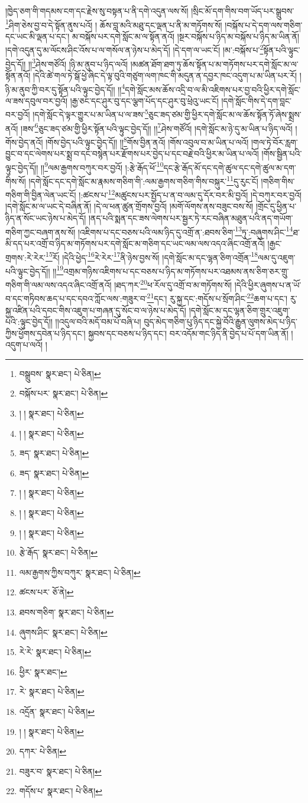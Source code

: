 །ཁྱེད་ཅག་གི་གདམས་ངག་དང་རྗེས་སུ་བསྟན་པ་ནི་དགེ་འདུན་ལས་སོ། །སྲིང་མོ་དག་གིས་བག་ཡོད་པར་སྒྲུབས་\footnote{བསྒྲུབས་  སྣར་ཐང་།  པེ་ཅིན། }ཤིག་ཅེས་བྱ་བ་དེ་སྟོན་ནུས་པའོ། །
ཆོས་བླ་མའི་མཐུ་དང་ལྡན་པ་ནི་མ་གཏོགས་སོ། །བསྐོས་པ་དེ་དག་ལས་གཅིག་དང་ཡང་མི་ལྡན་པ་དང་། མ་བསྐོས་པར་དགེ་སློང་མ་ལ་སྟོན་ནའོ། །སྔར་བསྐོས་པ་ཉིད་མ་བསྐོས་པ་ཉིད་མ་ཡིན་ནོ། །དགེ་འདུན་དུ་མ་ལོངས་ཤིང་འོས་པ་ལ་གསོལ་ན་ཉེས་པ་མེད་དོ། །དེ་དག་ལ་ཡང་ངོ། །མ་:བསྐོས་པ་\footnote{བསྐོས་པར་  སྣར་ཐང་།  པེ་ཅིན། }སྟོན་པའི་ལྟུང་བྱེད་དོ།། །།\footnote{། །  སྣར་ཐང་།  པེ་ཅིན། }ཤེས་གཙོའོ། །ཉི་མ་ནུབ་པ་ཉིད་ལའོ། །མཚན་ཐོག་ཐག་ཏུ་ཆོས་སྟོན་པ་མ་གཏོགས་པར་དགེ་སློང་མ་ལ་སྟོན་ནའོ། །དེའི་ཚེ་གལ་ཏེ་སྒོ་ཕྱེ་ཞིང་དེ་ལྟ་བུའི་གཙུག་ལག་ཁང་གི་མདུན་ན་དབྱར་ཁང་འདུག་པ་མ་ཡིན་པར་རོ། །ཉི་མ་ནུབ་ཀྱི་བར་དུ་སྟོན་པའི་ལྟུང་བྱེད་དོ།། །།\footnote{། །  སྣར་ཐང་།  པེ་ཅིན། }དགེ་སློང་མས་ཆོས་འདྲི་བ་ལ་མི་འཇིགས་པར་བྱ་བའི་ཕྱིར་དགེ་སློང་ལ་ཟས་དབུལ་བར་བྱའོ། །རྒྱ་ཅང་དང་ཤུར་བུ་དང་ལྕག་པོད་དང་ཤུར་བུ་ཕྲེའུ་ཡང་ངོ། །དགེ་སློང་གིས་དེ་དག་བླང་བར་བྱའོ། །དགེ་སློང་དེ་ལྟར་གྱུར་པ་མ་ཡིན་པ་ལ་ཟས་\footnote{ཟད་  སྣར་ཐང་།  པེ་ཅིན། }ཅུང་ཟད་ཙམ་གྱི་ཕྱིར་དགེ་སློང་མ་ལ་ཆོས་སྟོན་ཏོ་ཞེས་སྨྲས་ནའོ། །ཟས་\footnote{ཟད་  སྣར་ཐང་།  པེ་ཅིན། }ཅུང་ཟད་ཙམ་གྱི་ཕྱིར་སྟོན་པའི་ལྟུང་བྱེད་དོ།། །།\footnote{། །  སྣར་ཐང་།  པེ་ཅིན། }ཤེས་གཙོའོ། །དགེ་སློང་མ་ཉེ་དུ་མ་ཡིན་པ་ཉིད་ལའོ། །གོས་བྱེད་ནའོ། །གོས་བྱེད་པའི་ལྟུང་བྱེད་དོ།། །།\footnote{། །  སྣར་ཐང་།  པེ་ཅིན། }གོས་བྱིན་ནའོ། །གོས་འབུལ་བ་མ་ཡིན་པ་ལའོ། །གལ་ཏེ་བོར་རླག་བྱུང་བ་དང་ལེགས་པར་སྨྲ་བ་དང་བསྙེན་པར་རྫོགས་པར་བྱེད་པ་དང་བརྗེ་བའི་ཕྱིར་མ་ཡིན་པ་ལའོ། །གོས་སྦྱིན་པའི་ལྟུང་བྱེད་དོ།། །།\footnote{། །  སྣར་ཐང་།  པེ་ཅིན། }ལམ་རྒྱགས་བཀུར་བར་བྱའོ། །:རྩེ་རྒོད་ཕོ་\footnote{རྩེ་རྒོད་  སྣར་ཐང་།  པེ་ཅིན། }དང་རྩེ་རྒོད་མོ་དང་དགེ་ཚུལ་དང་དགེ་ཚུལ་མ་དག་གིས་སོ། །དགེ་སློང་དང་དགེ་སློང་མ་རྣམས་གཅིག་གི་:ལམ་རྒྱགས་གཅིག་གིས་བསྐུར་\footnote{ལམ་རྒྱགས་ཀྱིས་བཀུར་  སྣར་ཐང་།  པེ་ཅིན། }དུ་རུང་ངོ། །གཅིག་གིས་གཅིག་གི་བྱིན་ལེན་ཡང་ངོ། །:ཚངས་པ་\footnote{ཚངས་པར་  ཅོ་ནེ། }མཚུངས་པར་སྤྱོད་པ་ན་བ་ལམ་དུ་དོར་བར་མི་བྱའོ། །དེ་བཀུར་བར་བྱའོ། །དགེ་སློང་མ་ལ་ཡང་དེ་བཞིན་ནོ། །དེ་ལ་ཕན་ཚུན་གྲོགས་བྱའོ། །མགོ་ལོགས་ནས་བཟུང་བས་སོ། །གྲོང་དུ་ཕྱིན་པ་ཉིད་ན་སོང་ཡང་ཉེས་པ་མེད་དོ། །ནད་པའི་སྨན་དང་ཟས་ལེགས་པར་སྦྱར་ཏེ་རང་བཞིན་མཐུན་པའི་ནད་གཡོག་གཅིག་ཀྱང་བཞག་ནས་སོ། །འཇིགས་པ་དང་བཅས་པའི་ལམ་ཉིད་དུ་འགྲོ་ན་:ཐབས་ཅིག་\footnote{ཐབས་གཅིག་  སྣར་ཐང་།  པེ་ཅིན། }ཏུ་:བཞུགས་ཤིང་\footnote{ཞུགས་ཤིང་  སྣར་ཐང་།  པེ་ཅིན། }ཐ་མི་དད་པར་འགྲོ་བ་ཉིད་མ་གཏོགས་པར་དགེ་སློང་མ་གཅིག་དང་ཡང་ལམ་ལས་འདའ་ཞིང་འགྲོ་ནའོ། །རྒྱང་གྲགས་:རེ་རེར་\footnote{རེ་རེ་  སྣར་ཐང་།  པེ་ཅིན། }རོ། །དེའི་ཕྱེད་\footnote{ཕྱིར་  སྣར་ཐང་། }རེ་རེར་\footnote{རེ་  སྣར་ཐང་།  པེ་ཅིན། }ནི་ཉེས་བྱས་སོ། །དགེ་སློང་མ་དང་ལྷན་ཅིག་འགྲོན་\footnote{འདྲོན་  སྣར་ཐང་།  པེ་ཅིན། }ལམ་དུ་འཇུག་པའི་ལྟུང་བྱེད་དོ།། །།\footnote{། །  སྣར་ཐང་།  པེ་ཅིན། }འགྲམ་གཉིས་འཇིགས་པ་དང་བཅས་པ་ཉིད་མ་གཏོགས་པར་འཐམས་ནས་ཅིག་ཅར་གྲུ་གཅིག་གི་ལམ་ལས་འདའ་ཞིང་འགྲོ་ནའོ། །ཐད་ཀར་\footnote{དཀར་  པེ་ཅིན། }ཕ་རོལ་དུ་འགྲོ་བ་མ་གཏོགས་སོ། །དེའི་ཕྱིར་ཞུགས་པ་ན་ཡོ་བ་དང་གཏིབས་ཆད་པ་དང་དབའ་ཀློང་ལས་:གཟུར་བ་\footnote{བཟུར་བ་  སྣར་ཐང་།  པེ་ཅིན། }དང་། རུ་སྐྱ་དང་:གདོས་པ་སྲོག་ཤིང་\footnote{གདོས་པ་  སྣར་ཐང་།  པེ་ཅིན། }ཆག་པ་དང་། རུ་སྐྱ་འཛིན་པའི་དབང་གིས་འཇུག་པ་གཞན་དུ་སོང་བ་ལ་ཉེས་པ་མེད་དོ། །དགེ་སློང་མ་དང་ལྷན་ཅིག་གྲུར་འཇུག་པའི་:ལྟུང་བྱེད་དོ།། །།འདུལ་བའི་མདོ་བམ་པོ་བཞི་པ། བུད་མེད་གཅིག་པུ་ཉིད་དང་སྐྱེ་བོའི་རྒྱུན་ལུགས་མེད་པ་ཉིད་ཀྱིས་ཕྱོགས་དབེན་པ་ཉིད་དང་། སྐྱབས་དང་བཅས་པ་ཉིད་དང་། བར་འདོམ་གང་ཉིད་ནི་བྱེད་པ་པོ་དག་ཡིན་ནོ། །འདུག་པ་ལའོ། །
